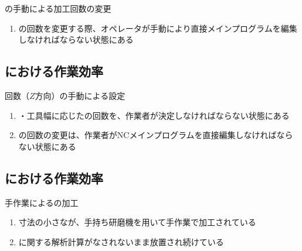 \begin{Issues}{\EndFacecutMilling の手動による加工回数の変更}
\begin{enumerate}[label=\sarrow]
\item[{\sarrow[red]}]\EndFacecutMilling の回数を変更する際、オペレータが手動により直接メインプログラムを編集しなければならない状態にある
\end{enumerate}
\end{Issues}


\subsection{\KeywayMilling における作業効率}

\begin{Issues}{\KeywayMilling 回数（$Z$方向）の手動による設定}
\begin{enumerate}[label=\sarrow]
\item[{\sarrow[red]}]\KeywayWidth・工具幅に応じた\KeywayMilling の回数を、作業者が決定しなければならない状態にある
\item[{\sarrow[red]}]\KeywayMilling の回数の変更は、作業者がNCメインプログラムを直接編集しなければならない状態にある
\end{enumerate}
\end{Issues}


\subsection{\EndFaceChamferMilling における作業効率}

\begin{Issues}{手作業による\EndFaceChamferMilling の加工}
\begin{enumerate}[label=\sarrow]
\item[{\sarrow[red]}]寸法の小さな\EndFaceChamferMilling が、手持ち研磨機を用いて手作業で加工されている
\item[{\sarrow[red]}]\EndFaceChamferMilling に関する解析計算がなされないまま放置され続けている
\end{enumerate}
\end{Issues}



